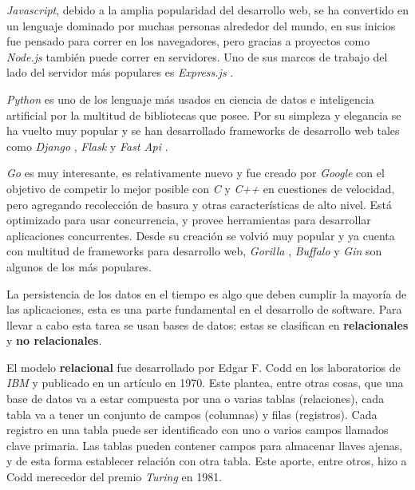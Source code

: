 \textit{Javascript}, debido a la amplia popularidad del desarrollo web, se ha convertido en un lenguaje dominado por muchas personas alrededor del mundo, en sus inicios fue pensado para correr en los navegadores, pero gracias a proyectos como \textit{Node.js} \cite{node} también puede correr en servidores. Uno de sus marcos de trabajo del lado del servidor más populares  es \textit{Express.js} \cite{express}.
\newline

\textit{Python} es uno de los lenguaje más usados en ciencia de datos e inteligencia artificial por la multitud de bibliotecas que posee. Por su simpleza y elegancia se ha vuelto muy popular y se han desarrollado frameworks de desarrollo web tales como \textit{Django} \cite{django}, \textit{Flask} \cite{flask} y \textit{Fast Api} \cite{fastapi}.
\newline

\textit{Go} \cite{golang} es muy interesante, es relativamente nuevo y fue creado por \textit{Google} con el objetivo de competir lo mejor posible con \textit{C} y \textit{C++} en cuestiones de velocidad, pero agregando recolección de basura y otras características de alto nivel. Está optimizado para usar concurrencia, y provee herramientas para desarrollar aplicaciones concurrentes. Desde su creación se volvió muy popular y ya cuenta con multitud de frameworks para desarrollo web, \textit{Gorilla} \cite{gorilla}, \textit{Buffalo} \cite{buffalo} y \textit{Gin} \cite{gin} son algunos de los más populares.
\newline

La persistencia de los datos en el tiempo es algo que deben cumplir la mayoría de las aplicaciones, esta es una parte fundamental en el desarrollo de software. Para llevar a cabo esta tarea se usan bases de datos: estas se clasifican en \textbf{relacionales} y \textbf{no relacionales}.
\newline

El modelo \textbf{relacional} \cite{bd_relational} fue desarrollado por Edgar F. Codd en los laboratorios de \textit{IBM} y publicado en un artículo \cite{bd_relational} en 1970. Este plantea, entre otras cosas, que una base de datos va a estar compuesta por una o varias tablas (relaciones), cada tabla va a tener un conjunto de campos (columnas) y filas (registros). Cada registro en una tabla puede ser identificado con uno o varios campos llamados clave primaria. Las tablas pueden contener campos para almacenar llaves ajenas, y de esta forma establecer relación con otra tabla. Este aporte, entre otros, hizo a Codd merecedor del premio \textit{Turing} \cite{codd_turing} en 1981.
\newline

